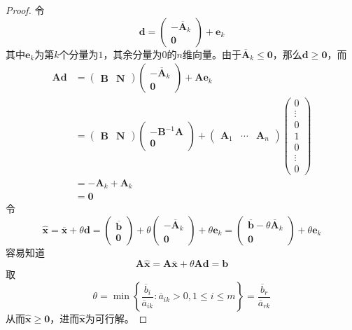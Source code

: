 \documentclass[lang = cn, scheme = chinese, thmcnt = section]{elegantbook}
\newcommand{\bs}{\boldsymbol}          %
\begin{document}
\begin{proof}
	令
	$$
	\bs{d}=\begin{pmatrix}
		-\overline{\bs{A}}_k\\\bs{0}
	\end{pmatrix}
	+\bs{e}_k
	$$
	其中$\bs{e}_k$为第$k$个分量为$1$，其余分量为$0$的$n$维向量。由于$\overline{\bs{A}}_k\le \bs{0}$，那么$\bs{d}\ge \bs{0}$，而
	\begin{align*}
		\bs{Ad}
		& = \begin{pmatrix}
			\bs{B} & \bs{N}
		\end{pmatrix}
		\begin{pmatrix}
			-\overline{\bs{A}}_k\\\bs{0}
		\end{pmatrix}
		+\bs{Ae}_k\\
		& = \begin{pmatrix}
			\bs{B} & \bs{N}
		\end{pmatrix}
		\begin{pmatrix}
			-\bs{B}^{-1}\bs{A}\\\bs{0}
		\end{pmatrix}
		+\begin{pmatrix}
			\bs{A}_1 & \cdots & \bs{A}_n
		\end{pmatrix}
		\begin{pmatrix}
			0 \\ \vdots \\ 0 \\ 1 \\ 0 \\ \vdots \\ 0
		\end{pmatrix}\\
		& = -\bs{A}_k+\bs{A}_k\\
		& = \bs{0}
	\end{align*}
	令
	$$
	\hat{\bs{x}}
	=\overline{\bs{x}}+\theta\bs{d}
	=\begin{pmatrix}
		\overline{\bs{b}} \\ \bs{0}
	\end{pmatrix}
	+\theta\begin{pmatrix}
		-\overline{\bs{A}}_k\\\bs{0}
	\end{pmatrix}
	+\theta\bs{e}_k
	=\begin{pmatrix}
		\overline{\bs{b}}-\theta\overline{\bs{A}}_k\\\bs{0}
	\end{pmatrix}
	+\theta\bs{e}_k
	$$
	容易知道
	$$
	\bs{A}\hat{\bs{x}}
	=\bs{A}\overline{\bs{x}}+\theta\bs{Ad}
	=\bs{b}
	$$
	取
	$$
	\theta
	=\min\left\{ \frac{\overline{b}_i}{\overline{a}_{ik}}:\overline{a}_{ik}>0,1\le i \le m \right\}
	=\frac{\overline{b}_r}{\overline{a}_{rk}}
	$$
	从而$\hat{\bs{x}}\ge \bs{0}$，进而$\hat{\bs{x}}$为可行解。
	

\end{proof}
\end{document}
